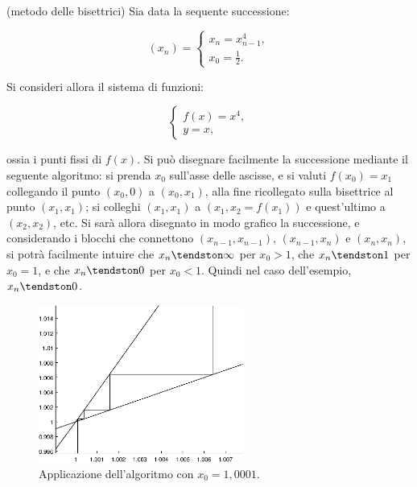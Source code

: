 \documentclass[11pt]{article}
\begin{document}
\begin{example} (metodo delle bisettrici)
Sia data la sequente successione:

\[ (x_n) = \begin{cases} x_n = x_{n-1}^4, \\ x_0 = \frac12. \end{cases} \]

Si consideri allora il sistema di funzioni:

\[ \begin{cases}
    f(x) = x^4, \\ y = x,
\end{cases} \]

ossia i punti fissi di $f(x)$. Si può disegnare facilmente
la successione mediante il seguente algoritmo: si prenda
$x_0$ sull'asse delle ascisse, e si valuti $f(x_0) = x_1$ collegando
il punto $(x_0, 0)$ a $(x_0, x_1)$,
alla fine ricollegato sulla bisettrice al punto $(x_1, x_1)$;
si colleghi $(x_1, x_1)$ a $(x_1, x_2 = f(x_1))$ e quest'ultimo a
$(x_2, x_2)$, etc. Si sarà allora
disegnato in modo grafico la successione, e considerando
i blocchi che connettono $(x_{n-1}, x_{n-1})$, $(x_{n-1}, x_n)$
e $(x_n, x_n)$, si potrà facilmente intuire che $x_n \tendston \infty$ per $x_0 > 1$, che $x_n \tendston 1$ per $x_0 = 1$,
e che $x_n \tendston 0$ per $x_0 < 1$. Quindi nel caso
dell'esempio, $x_n \tendston 0$.

\begin{figure}[H]
    \centering
    \includegraphics[width=0.6\textwidth]{esempio.eps}
    \caption{Applicazione dell'algoritmo con $x_0 = 1,0001$.}
    \label{fig:my_label}
\end{figure}

\end{example}
\end{document}
